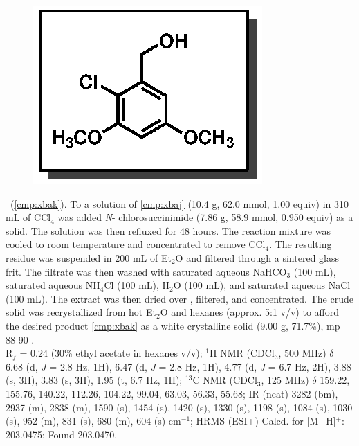\vspace{10pt}
\begin{figure}
  \vspace{-25pt}
  \begin{center}
    \includegraphics[scale=0.8]{chp_singlecarbon/images/xbak}
  \end{center}
  \vspace{-30pt}
\end{figure}\noindent \textbf{\CMPxbak}\ (\ref{cmp:xbak}). To a solution
of \ref{cmp:xbaj} (10.4 g, 62.0 mmol, 1.00 equiv) in 310 mL of CCl$_4$ was added \textit{N}-
chlorosuccinimide (7.86 g, 58.9 mmol, 0.950 equiv) as a solid. The solution
was then refluxed for 48 hours. The reaction mixture was cooled to room
temperature and concentrated to remove CCl$_4$. The resulting residue was suspended in 200 mL of
Et$_2$O and filtered through a sintered glass frit. The filtrate was then washed with saturated
aqueous NaHCO$_3$ (100 mL), saturated aqueous NH$_4$Cl (100 mL), H$_2$O (100 mL), and saturated
aqueous NaCl (100 mL). The extract was then dried over , filtered, and concentrated. The
crude solid was recrystallized from hot Et$_2$O and hexanes (approx. 5:1 v/v) to afford the desired
product \ref{cmp:xbak} as a white crystalline solid (9.00 g, 71.7\%), mp 88-90 \degc.\\
R$_f$ = 0.24 (30\% ethyl acetate in hexanes v/v); $^1$H NMR (CDCl$_3$, 500 MHz) $\delta$ 6.68 (d, \textit{J} = 2.8 Hz, 1H),
6.47 (d, \textit{J} = 2.8 Hz, 1H), 4.77 (d, \textit{J} = 6.7 Hz, 2H), 3.88 (s, 3H), 3.83 (s, 3H), 1.95 (t, 6.7 Hz, 1H);
$^{13}$C NMR (CDCl$_3$, 125 MHz) $\delta$ 159.22, 155.76, 140.22, 112.26, 104.22, 99.04, 63.03,
56.33, 55.68; IR (neat) 3282 (bm), 2937 (m), 2838 (m), 1590 (s), 1454 (s), 1420 (s), 1330 (s), 1198 (s),
1084 (s), 1030 (s), 952 (m), 831 (s), 680 (m), 604 (s) cm$^{-1}$; HRMS (ESI+) Calcd. for
 [M+H]$^+$: 203.0475; Found 203.0470.

